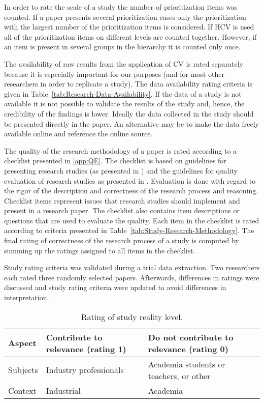 In order to rate the scale of a study the number of prioritization items was counted.
If a paper presents several prioritization cases only the prioritization with the largest number of the prioritization items is considered.
If HCV is used all of the prioritization items on different levels are counted together. However, if an item is present in several groups in the hierarchy it is counted only once.

The availability of raw results from the application of CV is rated separately because it is especially important for our purposes (and for most other researchers in order to replicate a study). The data availability rating criteria is given in Table~\ref{tab:Research-Data-Availability}. If the data of a study is not available it is not possible to validate the results of the study and, hence, the credibility of the findings is lower. Ideally the data collected in the study should be presented directly in the paper. An alternative may be to make the data freely available online and reference the online source.

The quality of the research methodology of a paper is rated according to a checklist presented in \ref{app:QE}. The checklist is based on guidelines for presenting research studies (as presented in \cite{Wohlin2000,Jedlitschka2005}) and the guidelines for quality evaluation of research studies as presented in \cite{Kitchenham2007,Ivarsson2010}. Evaluation is done with regard to the rigor of the description and correctness of the research process and reasoning. Checklist items represent issues that research studies should implement and present in a research paper. The checklist also contains item descriptions or questions that are used to evaluate the quality. Each item in the checklist is rated according to criteria presented in Table~\ref{tab:Study-Research-Methodology}. The final rating of correctness of the research process of a study is computed by summing up the ratings assigned to all items in the checklist.

Study rating criteria was validated during a trial data extraction. Two researchers each rated three randomly selected papers. Afterwards, differences in ratings were discussed and study rating criteria were updated to avoid differences in interpretation.

\begin{table}
	\scriptsize
\caption{\label{tab:Study-Setting-Rating}Rating of study reality level.}
\begin{tabular}{|>{\centering}p{}|>{\centering}p{}|>{\centering}p{}|}
\hline 
Aspect & Contribute to relevance (rating 1) & Do not contribute to relevance (rating 0)\tabularnewline
\hline\hline
Subjects & Industry professionals & Academia students or teachers, or other\tabularnewline
\hline 
Context & Industrial & Academia\tabularnewline
\hline 
\end{tabular}%
\end{table}


